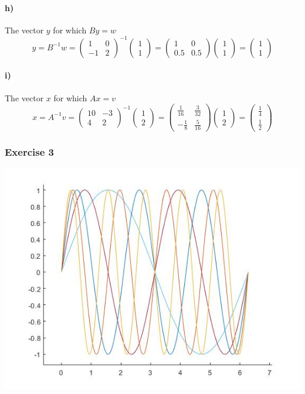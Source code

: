 \documentclass{article}
\begin{document}
\paragraph{h)}
The vector $y$ for which $By = w$
\[y = B^{-1}w = \begin{pmatrix}1 & 0\\-1&2\end{pmatrix}^{-1}\begin{pmatrix}1\\1\end{pmatrix} = \begin{pmatrix}1 & 0\\0.5&0.5\end{pmatrix}\begin{pmatrix}1\\1\end{pmatrix} = \begin{pmatrix}1\\1\end{pmatrix}\]
\paragraph{i)}
The vector $x$ for which $Ax = v$
\[x = A^{-1}v = \begin{pmatrix}10&-3\\4&2\end{pmatrix}^{-1}\begin{pmatrix}1\\2\end{pmatrix} = \begin{pmatrix}\frac{1}{16} &\frac{3}{32}\\-\frac{1}{8}&\frac{5}{16}\end{pmatrix}\begin{pmatrix}1\\2\end{pmatrix} = \begin{pmatrix}\frac{1}{4}\\\frac{1}{2}\end{pmatrix}\]

\subsubsection{Exercise 3}
\includegraphics[scale=0.5]{Ex3.jpg}
\end{document}
